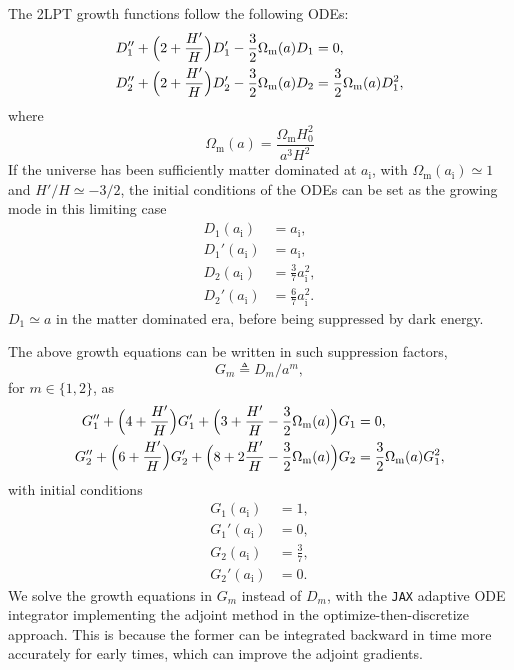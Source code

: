 \documentclass[modern, dvipsnames]{aastex631}
\newcommand{\Omegam}{\Omega_\mathrm{m}}
\newcommand{\ic}{\mathrm{i}}
\begin{document}
The 2LPT growth functions follow the following ODEs:
%
\begin{align}
D_1'' + \Bigl( 2 + \frac{H'}H \Bigr) D_1' - \frac32 \Omegam(a) D_1
  &= 0, \nonumber\\
%
D_2'' + \Bigl( 2 + \frac{H'}H \Bigr) D_2' - \frac32 \Omegam(a) D_2
  &= \frac32 \Omegam(a) D_1^2,
\end{align}
%
where
%
\begin{equation}
\Omegam(a) = \frac{\Omegam H_0^2}{a^3 H^2}
\end{equation}
%
If the universe has been sufficiently matter dominated at $a_\ic$, with
$\Omegam(a_\ic) \simeq 1$ and $H'/H \simeq -3/2$, the initial conditions
of the ODEs can be set as the growing mode in this limiting case
%
\begin{align}
D_1(a_\ic) &= a_\ic, \nonumber\\
D_1'(a_\ic) &= a_\ic, \nonumber\\
D_2(a_\ic) &= \frac37 a_\ic^2, \nonumber\\
D_2'(a_\ic) &= \frac67 a_\ic^2.
\end{align}
%
$D_1 \simeq a$ in the matter dominated era, before being suppressed by
dark energy.

The above growth equations can be written in such suppression factors,
%
\begin{equation}
G_m \triangleq D_m / a^m,
\end{equation}
%
for $m \in \{1, 2\}$, as
%
\begin{align}
G_1'' + \Bigl( 4 + \frac{H'}H \Bigr) G_1'
  + \Bigl( 3 + \frac{H'}H - \frac32 \Omegam(a) \Bigr) G_1
  &= 0, \nonumber\\
%
G_2'' + \Bigl( 6 + \frac{H'}H \Bigr) G_2'
  + \Bigl( 8 + 2\frac{H'}H - \frac32 \Omegam(a) \Bigr) G_2
  &= \frac32 \Omegam(a) G_1^2,
\end{align}
%
with initial conditions
%
\begin{align}
G_1(a_\ic) &= 1, \nonumber\\
G_1'(a_\ic) &= 0, \nonumber\\
G_2(a_\ic) &= \frac37, \nonumber\\
G_2'(a_\ic) &= 0.
\end{align}
%
We solve the growth equations in $G_m$ instead of $D_m$, with the
\texttt{JAX} adaptive ODE integrator implementing the adjoint method in
the optimize-then-discretize approach.
This is because the former can be integrated backward in time more
accurately for early times, which can improve the adjoint gradients.
\end{document}
